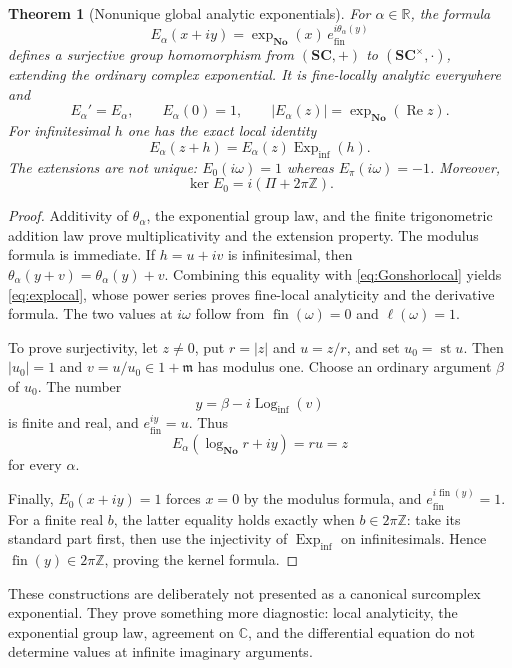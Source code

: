 \documentclass[11pt,letterpaper]{article}
\newtheorem{theorem}{Theorem}[section]
\theoremstyle{definition}
\theoremstyle{remark}
\newcommand{\No}{\mathbf{No}}
\newcommand{\SC}{\mathbf{SC}}
\newcommand{\R}{\mathbb R}
\newcommand{\C}{\mathbb C}
\newcommand{\Z}{\mathbb Z}
\newcommand{\mm}{\mathfrak m}
\newcommand{\fin}{\operatorname{fin}}
\newcommand{\st}{\operatorname{st}}
\newcommand{\re}{\operatorname{Re}}
\newcommand{\Logi}{\operatorname{Log}_{\mathrm{inf}}}
\newcommand{\Expi}{\operatorname{Exp}_{\mathrm{inf}}}
\numberwithin{equation}{section}
\begin{document}
\begin{theorem}[Nonunique global analytic exponentials]\label{thm:globalexp}
For $\alpha\in\R$, the formula
\begin{equation}\label{eq:globalexp}
 E_\alpha(x+iy)=\exp_{\No}(x)\,
 e^{i\theta_\alpha(y)}_{\mathrm{fin}}
\end{equation}
defines a surjective group homomorphism from $(\SC,+)$ to $(\SC^\times,\cdot)$, extending the ordinary complex exponential. It is fine-locally analytic everywhere and
\[
 E_\alpha'=E_\alpha,\qquad E_\alpha(0)=1,
 \qquad |E_\alpha(z)|=\exp_{\No}(\re z).
\]
For infinitesimal $h$ one has the exact local identity
\begin{equation}\label{eq:explocal}
 E_\alpha(z+h)=E_\alpha(z)\Expi(h).
\end{equation}
The extensions are not unique: $E_0(i\omega)=1$ whereas $E_\pi(i\omega)=-1$. Moreover,
\[
 \ker E_0=i(\Pi+2\pi\Z).
\]
\end{theorem}
\begin{proof}
Additivity of $\theta_\alpha$, the exponential group law, and the finite trigonometric addition law prove multiplicativity and the extension property. The modulus formula is immediate. If $h=u+iv$ is infinitesimal, then $\theta_\alpha(y+v)=\theta_\alpha(y)+v$. Combining this equality with \eqref{eq:Gonshorlocal} yields \eqref{eq:explocal}, whose power series proves fine-local analyticity and the derivative formula. The two values at $i\omega$ follow from $\fin(\omega)=0$ and $\ell(\omega)=1$.

To prove surjectivity, let $z\ne0$, put $r=|z|$ and $u=z/r$, and set $u_0=\st u$. Then $|u_0|=1$ and $v=u/u_0\in1+\mm$ has modulus one. Choose an ordinary argument $\beta$ of $u_0$. The number
\[
 y=\beta-i\Logi(v)
\]
is finite and real, and $e^{iy}_{\mathrm{fin}}=u$. Thus
\[
 E_\alpha(\log_{\No}r+iy)=ru=z
\]
for every $\alpha$.

Finally, $E_0(x+iy)=1$ forces $x=0$ by the modulus formula, and $e^{i\fin(y)}_{\mathrm{fin}}=1$. For a finite real $b$, the latter equality holds exactly when $b\in2\pi\Z$: take its standard part first, then use the injectivity of $\Expi$ on infinitesimals. Hence $\fin(y)\in2\pi\Z$, proving the kernel formula.
\end{proof}
These constructions are deliberately not presented as a canonical surcomplex exponential. They prove something more diagnostic: local analyticity, the exponential group law, agreement on $\C$, and the differential equation do not determine values at infinite imaginary arguments.
\end{document}
